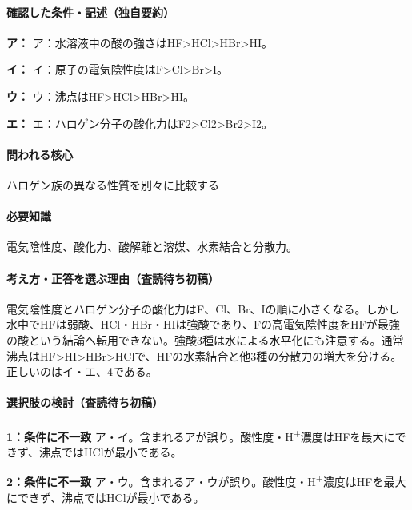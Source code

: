 \paragraph{確認した条件・記述（独自要約）}\mbox{}\par

\noindent\textbf{ア：} ア：水溶液中の酸の強さはHF>HCl>HBr>HI。\par

\noindent\textbf{イ：} イ：原子の電気陰性度はF>Cl>Br>I。\par

\noindent\textbf{ウ：} ウ：沸点はHF>HCl>HBr>HI。\par

\noindent\textbf{エ：} エ：ハロゲン分子の酸化力はF2>Cl2>Br2>I2。\par

\paragraph{問われる核心} ハロゲン族の異なる性質を別々に比較する

\paragraph{必要知識} 電気陰性度、酸化力、酸解離と溶媒、水素結合と分散力。

\paragraph{考え方・正答を選ぶ理由（査読待ち初稿）} 電気陰性度とハロゲン分子の酸化力はF、Cl、Br、Iの順に小さくなる。しかし水中でHFは弱酸、HCl・HBr・HIは強酸であり、Fの高電気陰性度をHFが最強の酸という結論へ転用できない。強酸3種は水による水平化にも注意する。通常沸点はHF>HI>HBr>HClで、HFの水素結合と他3種の分散力の増大を分ける。正しいのはイ・エ、4である。

\paragraph{選択肢の検討（査読待ち初稿）}\mbox{}\par

\noindent\textbf{1：条件に不一致} ア・イ。含まれるアが誤り。酸性度・H\textsuperscript{+}濃度はHFを最大にできず、沸点ではHClが最小である。\par

\noindent\textbf{2：条件に不一致} ア・ウ。含まれるア・ウが誤り。酸性度・H\textsuperscript{+}濃度はHFを最大にできず、沸点ではHClが最小である。\par

